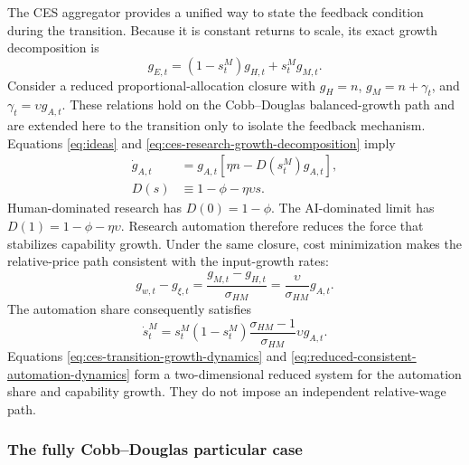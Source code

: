 The CES aggregator provides a unified way to state the feedback condition during
the transition. Because it is constant returns to scale, its exact growth
decomposition is
\begin{equation}
    g_{E,t}
    =
    (1-s^M_t)g_{H,t}+s^M_tg_{M,t}.
    \label{eq:ces-research-growth-decomposition}
\end{equation}
Consider a reduced proportional-allocation closure with $g_H=n$,
$g_M=n+\gamma_t$, and $\gamma_t=\upsilon g_{A,t}$. These relations hold on the
Cobb--Douglas balanced-growth path and are extended here to the transition only to
isolate the feedback mechanism. Equations \eqref{eq:ideas} and
\eqref{eq:ces-research-growth-decomposition} imply
\begin{align}
    \dot g_{A,t}
    &=
    g_{A,t}\left[\eta n-D(s^M_t)g_{A,t}\right],
    \label{eq:ces-transition-growth-dynamics}\\
    D(s)
    &\equiv
    1-\phi-\eta\upsilon s.
    \label{eq:automation-feedback-denominator}
\end{align}
Human-dominated research has $D(0)=1-\phi$. The AI-dominated limit has
$D(1)=1-\phi-\eta\upsilon$. Research automation therefore reduces the force that
stabilizes capability growth.
Under the same closure, cost minimization makes the relative-price path consistent
with the input-growth rates:
\begin{equation}
    g_{w,t}-g_{\xi,t}
    =
    \frac{g_{M,t}-g_{H,t}}{\sigma_{HM}}
    =
    \frac{\upsilon}{\sigma_{HM}}g_{A,t}.
    \label{eq:consistent-relative-cost-growth}
\end{equation}
The automation share consequently satisfies
\begin{equation}
    \dot s^M_t
    =
    s^M_t(1-s^M_t)
    \frac{\sigma_{HM}-1}{\sigma_{HM}}\upsilon g_{A,t}.
    \label{eq:reduced-consistent-automation-dynamics}
\end{equation}
Equations \eqref{eq:ces-transition-growth-dynamics} and
\eqref{eq:reduced-consistent-automation-dynamics} form a two-dimensional reduced
system for the automation share and capability growth. They do not impose an
independent relative-wage path.

\subsubsection{The fully Cobb--Douglas particular case}

